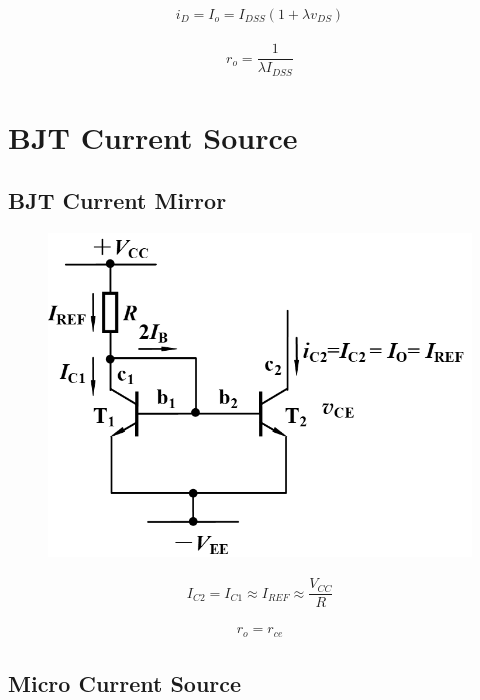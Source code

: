 \begin{equation*}
  \begin{aligned}
    i_D = I_o = I_{DSS} \left( 1 + \lambda v_{DS} \right)
  \end{aligned}
\end{equation*}

\begin{equation*}
  \begin{aligned}
    r_o = \dfrac{1}{\lambda I_{DSS}} 
  \end{aligned}
\end{equation*}

\section{BJT Current Source}

\subsection{BJT Current Mirror}

\begin{figure}[H]
  \centering
  \includegraphics[width=0.5\linewidth]{figures/BJT-Current-Source}
  \label{fig:}
\end{figure}

\begin{equation*}
  \begin{aligned}
    I_{C2} = I_{C1} \approx I_{REF} \approx \dfrac{V_{CC}}{R} 
  \end{aligned}
\end{equation*}

\begin{equation*}
  \begin{aligned}
    r_o = r_{ce}
  \end{aligned}
\end{equation*}

\subsection{Micro Current Source}

